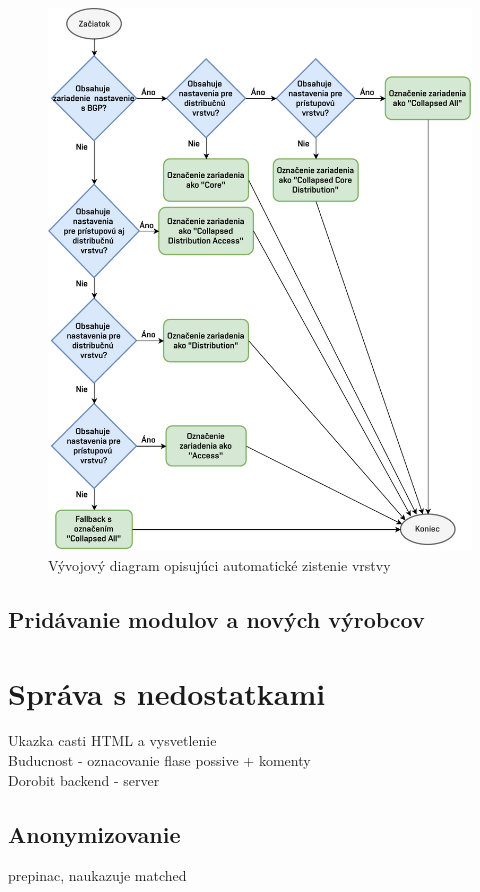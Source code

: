 \begin{figure}[H]
	\begin{center}
		\vspace*{-1cm}\includegraphics[scale=0.8]{obrazky/fac_layer.pdf}
	\end{center}
	\caption[Vývojový diagram opisujúci automatické zistenie vrstvy]{Vývojový diagram opisujúci automatické zistenie vrstvy}
	\label{fac_layer}
\end{figure}


\subsection{Pridávanie modulov a nových výrobcov}

\section{Správa s nedostatkami}
Ukazka casti HTML a vysvetlenie\\
Buducnost - oznacovanie flase possive + komenty\\
Dorobit backend - server \\
\subsection{Anonymizovanie}
prepinac, naukazuje matched




